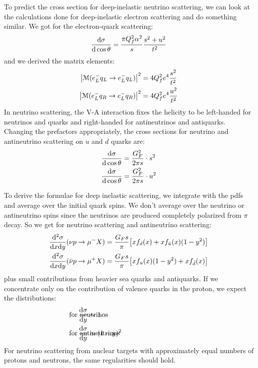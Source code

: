 \documentclass[../../main/main.tex]{subfiles}
\begin{document}
To predict the cross section for deep-inelastic neutrino scattering, we can look at the calculations done for deep-inelastic electron scattering and do something similar. We got for the electron-quark scattering:
\begin{equation}
	\dv{\sigma}{\cos \theta}
	=
	\frac{\pi Q_f^2 \alpha^2}{s} \frac{s^2 + u^2}{t^2}
	\label{eq:L13_VATNSCS}
\end{equation}
and we derived the matrix elements:
\begin{align}
	\abs{\mathcal{M}(e^-_L q_L \rightarrow e^-_L q_L)}^2
	&=
	4 Q^2_f e^4 \frac{s^2}{t^2}	\\
	\abs{\mathcal{M}(e^-_L q_R \rightarrow e^-_L q_R)}^2
	&=
	4 Q^2_f e^4 \frac{u^2}{t^2}
\end{align}
In neutrino scattering, the V-A interaction fixes the helicity to be left-handed for neutrinos and quarks and right-handed for antineutrinos and antiquarks. Changing the prefactors appropriately, the cross sections for neutrino and antineutrino scattering on \( u \) and \( d \) quarks are:
\begin{align}
	\dv{\sigma}{\cos \theta} (\nu_L d_L \rightarrow \mu^-_L u_L)
	&=
	\frac{G^2_F}{2\pi s} \cdot s^2	\\
	\dv{\sigma}{\cos \theta} (\bar{\nu}_R d_L \rightarrow \mu^+_R u_L)
	&=
	\frac{G^2_F}{2\pi s} \cdot u^2
\end{align}

To derive the formulae for deep inelastic scattering, we integrate with the pdfs and average over the initial quark spins. We don't average over the neutrino or antineutrino spins since the neutrinos are produced completely polarized from \( \pi \) decay. So we get for neutrino scattering and antineutrino scattering:
\begin{align}
	\frac{\mathrm{d}{^2 \sigma}}{\mathrm{d}{x} \mathrm{d}{y}}(\nu p \rightarrow \mu^- X)
	&=
	\frac{G_F s}{\pi} \qty[x f_d(x) + x f_{\bar{u}}(x)(1-y^2)]	\\
	\frac{\mathrm{d}{^2 \sigma}}{\mathrm{d}{x} \mathrm{d}{y}}(\bar{\nu} p \rightarrow \mu^+ X)
	&=
	\frac{G_F s}{\pi} \qty[x f_u(x)(1-y^2) + x f_{\bar{d}}(x)]
\end{align}
plus small contributions from heavier sea quarks and antiquarks. If we concentrate only on the contribution of valence quarks in the proton, we expect the distributions:
\begin{align}
	\dv{\sigma}{y}(\nu p) &\sim 1 && \hspace{-3.0cm} \text{for neutrinos} \hspace{3.0cm}	\\
	\dv{\sigma}{y}(\nu p) &\sim (1-y)^2 && \hspace{-3.0cm} \text{for antineutrinos} \hspace{3.0cm}
\end{align}
For neutrino scattering from nuclear targets with approximately equal numbers of protons and neutrons, the same regularities should hold.
\end{document}
